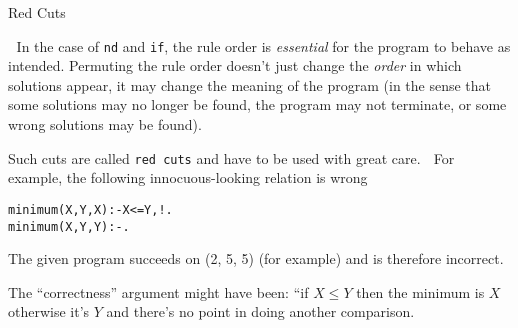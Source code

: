 \documentclass{popl}
\newenvironment{smalltt}{\begin{alltt}\smaller}{\end{alltt}}
\begin{document}
\begin{foil} 
\begin{cframed}
Red Cuts
\end{cframed}

In the case of {\tt nd} and {\tt if}, the rule order is {\it essential} for
the program to behave as intended. Permuting the rule
order doesn't just change the {\it order} in which
solutions appear, it may change the meaning of the program
(in the sense that some solutions may no longer be found, the program may not
terminate, or some wrong solutions may be found).

Such cuts are called  {\tt red cuts} and have to be used with great care. 

For example, the following innocuous-looking relation is wrong
\begin{smalltt}
        minimum(X, Y, X) :- X<=Y, !.
        minimum(X, Y, Y) :- .
\end{smalltt}
\begin{note}
The given program succeeds on (2, 5, 5) (for example) and is 
therefore incorrect.

The ``correctness'' argument might have been: ``if $X\leq Y$ then the minimum is $X$
otherwise it's $Y$ and there's no point in doing another comparison.
\end{note}

\end{foil}
\end{document}
